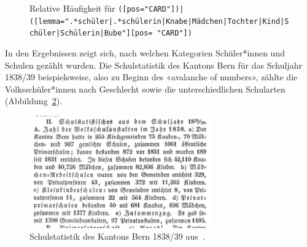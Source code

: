    \begin{figure}
        \caption{Relative Häufigkeit für \texttt{([pos="CARD"]\-[lemma=".*schü\-ler\-|.*schü\-lerin|\-Kna\-be|\-Mäd\-chen|\-Tochter|\-Kind|\-Schüler|\-Schül\-erin|Bu\-be"])|([lemma\-=".*schü\-ler\-|.*schü\-lerin|\-Kna\-be|\-Mäd\-chen|\-Tochter|\-Kind|\-Schü\-ler|\-Schü\-ler\-in|Bu\-be"][pos= "CARD"])}}
        \label{figure:5-1} 
    \end{figure}

In den Ergebnissen zeigt sich, nach welchen Kategorien Schüler*innen und Schulen gezählt wurden. Die Schulstatistik des Kantons Bern für das Schuljahr 1838/39 beispielsweise, also zu Beginn des «avalanche of numbers», zählte die Volksschüler*innen nach Geschlecht sowie die unterschiedlichen Schularten (Abbildung~\ref{figure:5-2}). 

\begin{figure}[!ht]
    \centering
    \includegraphics[width=0.7\textwidth]{../Figures/ass-001_1840_006_349_358_e739.jpg}
    \caption{Schulstatistik des Kantons Bern 1838/39 aus~\cite[356]{noauthor_kanton_1840}.}
    \label{figure:5-2}
\end{figure}

